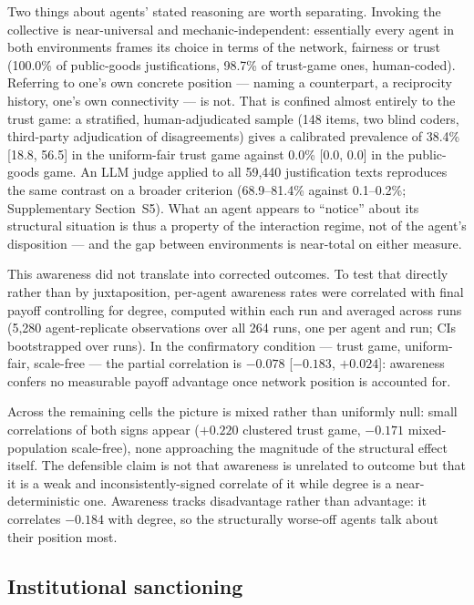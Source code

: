 \documentclass[11pt,a4paper]{article}
\begin{document}
Two things about agents' stated reasoning are worth separating.
Invoking the collective is near-universal and mechanic-independent:
essentially every agent in both environments frames its choice in
terms of the network, fairness or trust (100.0\% of public-goods
justifications, 98.7\% of trust-game ones, human-coded). Referring to
one's own concrete position --- naming a counterpart, a reciprocity
history, one's own connectivity --- is not. That is confined almost
entirely to the trust game: a stratified, human-adjudicated sample
(148 items, two blind coders, third-party adjudication of
disagreements) gives a calibrated prevalence of 38.4\%
[18.8, 56.5] in the uniform-fair trust game against 0.0\%
[0.0, 0.0] in the public-goods game. An LLM judge applied to all
59,440 justification texts reproduces the same contrast on a broader
criterion (68.9--81.4\% against 0.1--0.2\%; Supplementary
Section~S5).
What an agent appears to ``notice'' about its structural
situation is thus a property of the interaction regime, not of the
agent's disposition
--- and the gap between environments is near-total on either measure.

This awareness did not translate into corrected outcomes. To test that
directly rather than by juxtaposition, per-agent awareness rates were
correlated with final payoff controlling for degree, computed within
each run and averaged across runs (5,280 agent-replicate observations
over all 264 runs, one per agent and run; CIs bootstrapped over runs).
In the confirmatory
condition --- trust game, uniform-fair, scale-free --- the partial
correlation is $-0.078$ [$-0.183$, $+0.024$]: awareness confers no
measurable payoff advantage once network position is accounted for.

Across the remaining cells the picture is mixed rather than uniformly
null: small correlations of both signs appear ($+0.220$ clustered
trust game, $-0.171$ mixed-population scale-free), none approaching
the magnitude of the structural effect itself. The defensible claim is
not that awareness is unrelated to outcome but that it is a weak and
inconsistently-signed correlate of it while degree is a
near-deterministic one. Awareness tracks disadvantage rather than
advantage: it correlates $-0.184$ with degree, so the structurally
worse-off agents talk about their position most.

\subsection{Institutional sanctioning}
\end{document}
